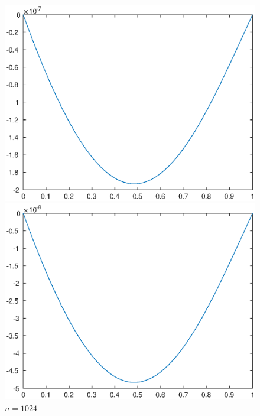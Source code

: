 \documentclass[lang=cn,10pt]{elegantbook}
\begin{document}
\begin{figure}[H]
  \centering
  \begin{minipage}[t]{0.24\linewidth}
      \centering
      \includegraphics[width=0.95\linewidth]{figure/1-1-1.eps}
      \caption*{$n=512$}
  \end{minipage}
  \begin{minipage}[t]{0.24\linewidth}
    \centering
    \includegraphics[width=0.95\linewidth]{figure/1-1-2.eps}
    \caption*{$n=1024$}
  \end{minipage}
  \begin{minipage}[t]{0.24\linewidth}
    \centering

\end{minipage}
\end{figure}
\end{document}
